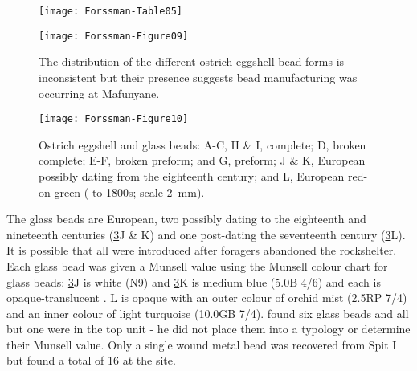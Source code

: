     	\begin{figure} %
    		\texttt{[image: Forssman-Table05]}
    		\centering
    		\label{fig:Forssman-Table05}
    	\end{figure}
 
 	\begin{figure} %
 		\texttt{[image: Forssman-Figure09]}
 		\caption{The distribution of the different ostrich eggshell bead forms is inconsistent but their presence suggests bead manufacturing was occurring at Mafunyane.}
 		\label{fig:Forssman-Figure09}
 	\end{figure}
 	
 	\begin{figure} %
 		\texttt{[image: Forssman-Figure10]}
 		\caption{Ostrich eggshell and glass beads: A-C, H \& I, complete; D, broken complete; E-F, broken preform; and G, preform; J \& K, European possibly dating from the eighteenth century; and L, European red-on-green ( to 1800s; scale \SI{2}{\milli\meter}).}
 		\label{fig:Forssman-Figure10}
 	\end{figure}
 
 
 The glass beads are European, two possibly dating to the eighteenth and nineteenth centuries (\cref{fig:Forssman-Figure10}J \& K) 
 and one post-dating the seventeenth century (\cref{fig:Forssman-Figure10}L). 
 It is possible that all were introduced after foragers abandoned the rockshelter. 
 Each glass bead was given a Munsell value using the Munsell colour chart for glass beads: 
 \cref{fig:Forssman-Figure10}J is white (N9) and \cref{fig:Forssman-Figure10}K is medium blue (5.0B 4/6) 
 and each is opaque-translucent 
 \parencite[slight glow of light along edges;][70]{Wood_2011}. 
 L is opaque with an outer colour of orchid mist (2.5RP 7/4) and an inner colour of light turquoise (10.0GB 7/4).  
 \textcite{Walker_1994} found six glass beads and all but one were in the top unit - he did not place them into a typology or determine their Munsell value. 
 Only a single wound metal bead was recovered from Spit I but \textcite{Walker_1994} found a total of 16 at the site.


